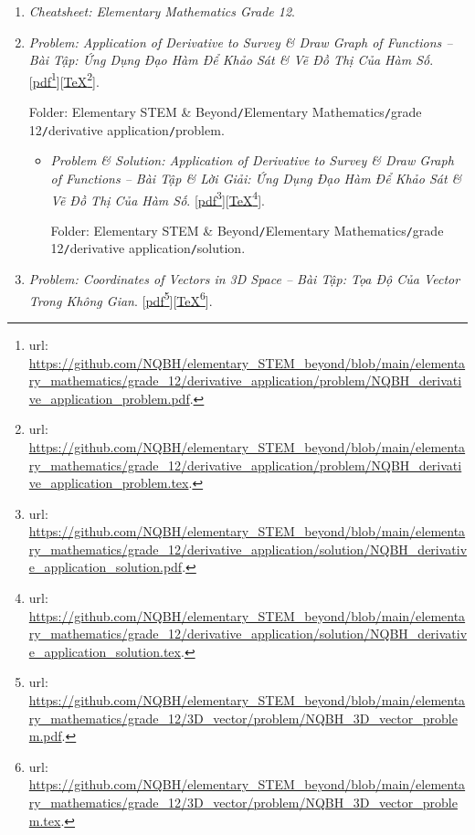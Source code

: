 \documentclass[12pt,twoside]{book}
\begin{document}
\begin{enumerate}
	\item {\it Cheatsheet: Elementary Mathematics Grade 12}.
	\item {\it Problem: Application of Derivative to Survey \& Draw Graph of Functions -- Bài Tập: Ứng Dụng Đạo Hàm Để Khảo Sát \& Vẽ Đồ Thị Của Hàm Số}. [\href{https://github.com/NQBH/elementary_STEM_beyond/blob/main/elementary_mathematics/grade_12/derivative_application/problem/NQBH_derivative_application_problem.pdf}{pdf}\footnote{{\sc url}: \url{https://github.com/NQBH/elementary_STEM_beyond/blob/main/elementary_mathematics/grade_12/derivative_application/problem/NQBH_derivative_application_problem.pdf}.}][\href{https://github.com/NQBH/elementary_STEM_beyond/blob/main/elementary_mathematics/grade_12/derivative_application/problem/NQBH_derivative_application_problem.tex}{\TeX}\footnote{{\sc url}: \url{https://github.com/NQBH/elementary_STEM_beyond/blob/main/elementary_mathematics/grade_12/derivative_application/problem/NQBH_derivative_application_problem.tex}.}].
	
	Folder: {\sf Elementary STEM \& Beyond{\tt/}Elementary Mathematics{\tt/}grade 12{\tt/}derivative application{\tt/}problem}.
	\begin{itemize}
		\item {\it Problem \& Solution: Application of Derivative to Survey \& Draw Graph of Functions -- Bài Tập \& Lời Giải: Ứng Dụng Đạo Hàm Để Khảo Sát \& Vẽ Đồ Thị Của Hàm Số}. [\href{https://github.com/NQBH/elementary_STEM_beyond/blob/main/elementary_mathematics/grade_12/derivative_application/solution/NQBH_derivative_application_solution.pdf}{pdf}\footnote{{\sc url}: \url{https://github.com/NQBH/elementary_STEM_beyond/blob/main/elementary_mathematics/grade_12/derivative_application/solution/NQBH_derivative_application_solution.pdf}.}][\href{https://github.com/NQBH/elementary_STEM_beyond/blob/main/elementary_mathematics/grade_12/derivative_application/solution/NQBH_derivative_application_solution.tex}{\TeX}\footnote{{\sc url}: \url{https://github.com/NQBH/elementary_STEM_beyond/blob/main/elementary_mathematics/grade_12/derivative_application/solution/NQBH_derivative_application_solution.tex}.}].
		
		Folder: {\sf Elementary STEM \& Beyond{\tt/}Elementary Mathematics{\tt/}grade 12{\tt/}derivative application{\tt/}solution}.
	\end{itemize}
	\item {\it Problem: Coordinates of Vectors in 3D Space -- Bài Tập: Tọa Độ Của Vector Trong Không Gian}. [\href{https://github.com/NQBH/elementary_STEM_beyond/blob/main/elementary_mathematics/grade_12/3D_vector/problem/NQBH_3D_vector_problem.pdf}{pdf}\footnote{{\sc url}: \url{https://github.com/NQBH/elementary_STEM_beyond/blob/main/elementary_mathematics/grade_12/3D_vector/problem/NQBH_3D_vector_problem.pdf}.}][\href{https://github.com/NQBH/elementary_STEM_beyond/blob/main/elementary_mathematics/grade_12/3D_vector/problem/NQBH_3D_vector_problem.tex}{\TeX}\footnote{{\sc url}: \url{https://github.com/NQBH/elementary_STEM_beyond/blob/main/elementary_mathematics/grade_12/3D_vector/problem/NQBH_3D_vector_problem.tex}.}].
	

\end{enumerate}
\end{document}
